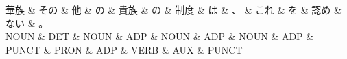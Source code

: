 \documentclass[tikz,border=5pt]{standalone}
\begin{document}
\normalsize
\begin{dependency}[edge unit distance=12.0pt]
    \begin{deptext}[column sep=1em]
        華族 \& その \& 他 \& の \& 貴族 \& の \& 制度 \& は \& 、 \& これ \& を \& 認め \& ない \& 。\\
        NOUN \& DET \& NOUN \& ADP \& NOUN \& ADP \& NOUN \& ADP \& PUNCT \& PRON \& ADP \& VERB \& AUX \& PUNCT\\
    \end{deptext}
\end{dependency}
\end{document}
